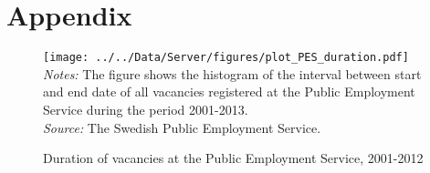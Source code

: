 \appendix
\section*{Appendix}
\label{sec:appendix}




\begin{figure}[h]
\centering
\caption{Duration of vacancies at the Public Employment Service, 2001-2012}
\texttt{[image: ../../Data/Server/figures/plot\_PES\_duration.pdf]}
\flushleft
\footnotesize{\emph{Notes:} The figure shows the histogram of the interval between start and end date of all vacancies registered at the Public Employment Service during the period 2001-2013.} \\
\footnotesize{\emph{Source:} The Swedish Public Employment Service.}
\label{fig:PES_duration}
\end{figure}

%




